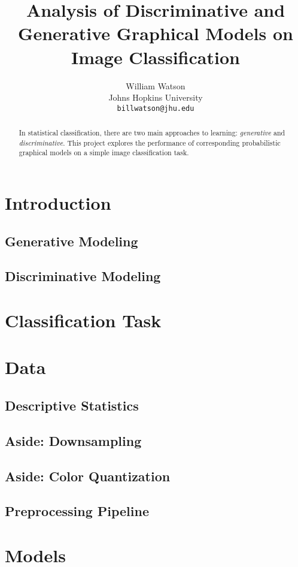 \documentclass{article}
\title{Analysis of Discriminative and Generative Graphical Models on Image Classification}
\author{%
  William Watson \\
  Johns Hopkins University\\
  \texttt{billwatson@jhu.edu} \\
}
\begin{document}

\maketitle

\begin{abstract}
  In statistical classification, there are two main approaches to learning:
  \textit{generative} and \textit{discriminative}. This project explores
  the performance of corresponding probabilistic graphical models on a
  simple image classification task.
\end{abstract}

\section{Introduction}
\subsection{Generative Modeling}
\subsection{Discriminative Modeling}

\section{Classification Task}

\section{Data}
\subsection{Descriptive Statistics}
\subsection{Aside: Downsampling}
\subsection{Aside: Color Quantization}
\subsection{Preprocessing Pipeline}

\section{Models}
\end{document}
